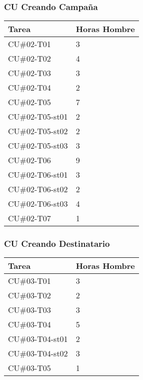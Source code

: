 \documentclass[a4paper, 11pt]{article}
\begin{document}
\subsubsection{CU Creando Campa\~na}
\begin{tabular}{| p{5cm} | p{5cm} |}

\hline
\bf{Tarea} & \bf{Horas Hombre} \\ \hline \hline
CU\#02-T01 &  3 \\ \hline
CU\#02-T02 &  4 \\ \hline
CU\#02-T03 &  3 \\ \hline
CU\#02-T04 &  2 \\ \hline
CU\#02-T05 &  7 \\ \hline
CU\#02-T05-st01 & 2 \\ \hline
CU\#02-T05-st02 & 2 \\ \hline
CU\#02-T05-st03 & 3 \\ \hline
CU\#02-T06 &  9 \\ \hline
CU\#02-T06-st01 & 3 \\ \hline
CU\#02-T06-st02 & 2 \\ \hline
CU\#02-T06-st03 & 4 \\ \hline
CU\#02-T07 &  1 \\ \hline
\end{tabular}

\subsubsection{CU Creando Destinatario}
\begin{tabular}{| p{5cm} | p{5cm} |}

\hline
\bf{Tarea} & \bf{Horas Hombre} \\ \hline \hline
CU\#03-T01 & 3 \\ \hline
CU\#03-T02 & 2 \\ \hline
CU\#03-T03 & 3 \\ \hline
CU\#03-T04 & 5 \\ \hline
CU\#03-T04-st01 & 2 \\ \hline
CU\#03-T04-st02 & 3 \\ \hline
CU\#03-T05 & 1 \\ \hline
\end{tabular}

\end{document}
